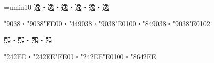 
\parindent=0pt
\font\jpy=umin10
\jpy
逸・逸︀・逸︁・逸󠄀・逸󠄁・逸󠄂\par
\kchar"9038・\kchar"9038\kchar"FE00・\kchar"449038・\kchar"9038\kchar"E0100・\kchar"849038・\kchar"9038\kchar"E0102\par
𤋮・𤋮︀・𤋮󠄀・𤋮󠄁\par
\kchar"242EE・\kchar"242EE\kchar"FE00・\kchar"242EE\kchar"E0100・\kchar"8642EE
\bye
